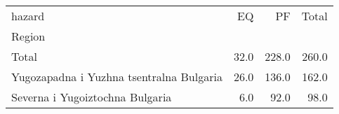 \begin{tabular}{lrrr}
\toprule
hazard &    EQ &     PF &  Total \\
Region                                   &       &        &        \\
\midrule
Total                                    &  32.0 &  228.0 &  260.0 \\
Yugozapadna i Yuzhna tsentralna Bulgaria &  26.0 &  136.0 &  162.0 \\
Severna i Yugoiztochna Bulgaria          &   6.0 &   92.0 &   98.0 \\
\bottomrule
\end{tabular}

